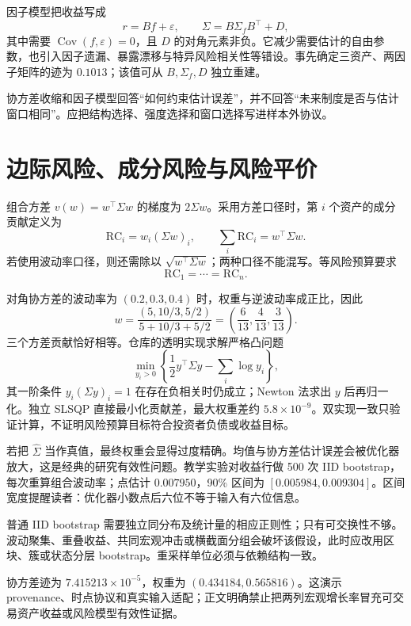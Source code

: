 

因子模型把收益写成
\[
 r=Bf+\varepsilon,\qquad
 \Sigma=B\Sigma_fB^\top+D,
\]
其中需要 $\operatorname{Cov}(f,\varepsilon)=0$，且 $D$ 的对角元素非负。它减少需要估计的自由参数，也引入因子遗漏、暴露漂移与特异风险相关性等错设。事先确定三资产、两因子矩阵的迹为 $0.1013$；该值可从 $B,\Sigma_f,D$ 独立重建。

\begin{diagnostic}
协方差收缩和因子模型回答“如何约束估计误差”，并不回答“未来制度是否与估计窗口相同”。应把结构选择、强度选择和窗口选择写进样本外协议。
\end{diagnostic}

\section{边际风险、成分风险与风险平价}

组合方差 $v(w)=w^\top\Sigma w$ 的梯度为 $2\Sigma w$。采用方差口径时，第 $i$ 个资产的成分贡献定义为
\[
 \mathrm{RC}_i=w_i(\Sigma w)_i,
 \qquad \sum_i\mathrm{RC}_i=w^\top\Sigma w.
\]
若使用波动率口径，则还需除以 $\sqrt{w^\top\Sigma w}$；两种口径不能混写。等风险预算要求
\[
 \mathrm{RC}_1=\cdots=\mathrm{RC}_n.
\]

对角协方差的波动率为 $(0.2,0.3,0.4)$ 时，权重与逆波动率成正比，因此
\[
 w=\frac{(5,10/3,5/2)}{5+10/3+5/2}
   =\left(\frac6{13},\frac4{13},\frac3{13}\right).
\]
三个方差贡献恰好相等。仓库的透明实现求解严格凸问题
\[
 \min_{y_i>0}\left\{\frac12y^\top\Sigma y-\sum_i\log y_i\right\},
\]
其一阶条件 $y_i(\Sigma y)_i=1$ 在存在负相关时仍成立；Newton 法求出 $y$ 后再归一化。独立 SLSQP 直接最小化贡献差，最大权重差约 $5.8\times10^{-9}$。双实现一致只验证计算，不证明风险预算目标符合投资者负债或收益目标。


若把 $\widehat\Sigma$ 当作真值，最终权重会显得过度精确。均值与协方差估计误差会被优化器放大，这是经典的研究有效性问题\cite{michaud1989markowitz}。教学实验对收益行做 500 次 IID bootstrap，每次重算组合波动率；点估计 $0.007950$，90\% 区间为 $[0.005984,0.009304]$。区间宽度提醒读者：优化器小数点后六位不等于输入有六位信息。

普通 IID bootstrap 需要独立同分布及统计量的相应正则性；只有可交换性不够。波动聚集、重叠收益、共同宏观冲击或横截面分组会破坏该假设，此时应改用区块、簇或状态分层 bootstrap。重采样单位必须与依赖结构一致。

协方差迹为 $7.415213\times10^{-5}$，权重为 $(0.434184,0.565816)$。这演示 provenance、时点协议和真实输入适配；正文明确禁止把两列宏观增长率冒充可交易资产收益或风险模型有效性证据。

